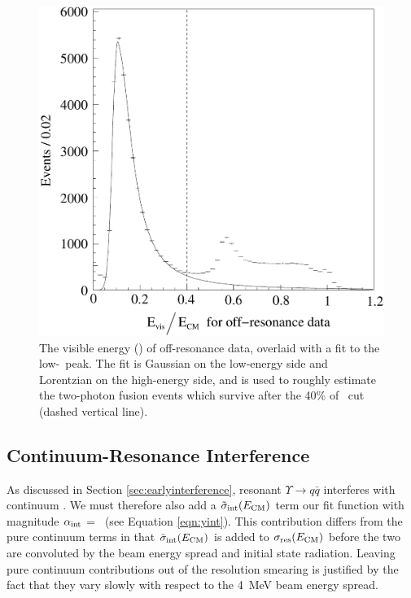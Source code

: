 \documentclass{cornell}
\begin{document}
\begin{figure}[p]
  \begin{center}
    \includegraphics[width=\linewidth]{plots/extrapolatevisen}
  \end{center}
  \caption{\label{extrapolatevisen} The visible energy (\visen) of
  off-resonance data, overlaid with a fit to the low-\visen\ peak.
  The fit is Gaussian on the low-energy side and Lorentzian on the
  high-energy side, and is used to roughly estimate the two-photon
  fusion events which survive after the 40\% of \ecm\ cut (dashed
  vertical line).} %
\end{figure}

\subsection{Continuum-Resonance Interference}

As discussed in Section \ref{sec:earlyinterference}, resonant
$\Upsilon \to q\bar{q}$ interferes with continuum \qqbar.  We
must therefore also add a $\tilde{\sigma}_{\mbox{\scriptsize int}}(E_{\mbox{\scriptsize CM}})$ term our
fit function with magnitude $\alpha_{\mbox{\scriptsize int}}$ = \bork\ (see Equation
\ref{eqn:yint}).  This contribution differs from the pure continuum
terms in that $\tilde{\sigma}_{\mbox{\scriptsize int}}(E_{\mbox{\scriptsize CM}})$ is added to
$\sigma_{\mbox{\scriptsize res}}(E_{\mbox{\scriptsize CM}})$ before the two are convoluted by the
beam energy spread and initial state radiation.  Leaving pure
continuum contributions out of the resolution smearing is justified by
the fact that they vary slowly with respect to the 4~MeV beam energy
spread.
\end{document}
